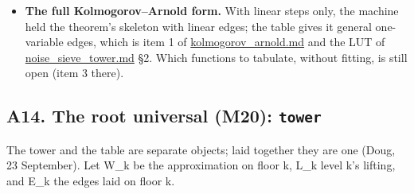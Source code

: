 \begin{itemize}
\begin{itemize}
\item \textbf{Proved} (\texttt{knf\_\allowbreak{}identity}, 23 checks, 0 failed, e4eae72): the knf of the nbody lattice (64³, 177 frames) against spatial null permutations. The host's walk equals the engine's knf at every voxel, and a single flipped bit leaves it unchanged exactly where the window rule says (1,500 of 8,192): the knf is many-to-one. The 48 exact cube motions carry the knf and keep its entangled entropy E and its cloud. The whole is its tiles plus its seams at every tile size. Alike-voxel controls are identified within 5σ of 1/20. \textbf{Measured:} E is 44.6 times the free null's mean, the inside and between departure curves cross between tiles of 2 and 4 and sum to 0.590 at 4, and each body's box has its own curve. Written in \hyperref[chap:two-crystals]{two\_\allowbreak{}crystals.md}.
\end{itemize}
\item \textbf{The full Kolmogorov–Arnold form.} With linear steps only, the machine held the theorem's skeleton with linear edges; the table gives it general one-variable edges, which is item 1 of \hyperref[chap:kolmogorov-arnold]{kolmogorov\_\allowbreak{}arnold.md} and the LUT of \hyperref[chap:noise-sieve-tower]{noise\_\allowbreak{}sieve\_\allowbreak{}tower.md} §2. Which functions to tabulate, without fitting, is still open (item 3 there).
\end{itemize}

\subsection{\texorpdfstring{A14. The root universal (M20): \texttt{tower}}{A14. The root universal (M20): tower}}

The tower and the table are separate objects; laid together they are one (Doug, 23 September). Let W\_\allowbreak{}k be the approximation on floor k, L\_\allowbreak{}k level k's lifting, and E\_\allowbreak{}k the edges laid on floor k.

